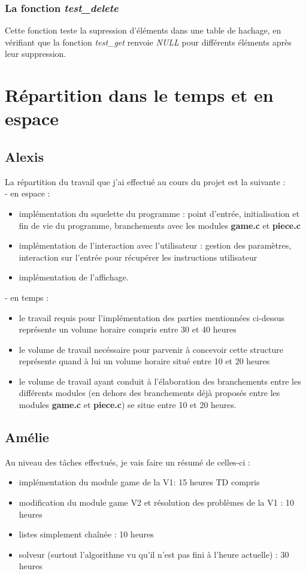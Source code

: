 \documentclass{report}
\begin{document}
\subsubsection*{La fonction \textit{test\_delete}}
Cette fonction teste la supression d'éléments dans une table de hachage, en vérifiant que la fonction \textit{test\_get} renvoie \textit{NULL} pour différents éléments  après leur suppression.

\section{Répartition dans le temps et en espace}
\subsection*{Alexis}
La répartition du travail que j'ai effectué au cours du projet est la suivante :\\
- en espace :
\begin{itemize}
\item implémentation du squelette du programme : point d'entrée, initialisation et fin de vie du programme, branchements avec les modules \textbf{game.c} et \textbf{piece.c}
\item implémentation de l'interaction avec l'utilisateur : gestion des paramètres, interaction sur l'entrée pour récupérer les instructions utilisateur
\item implémentation de l'affichage.
\end{itemize}
- en temps :
\begin{itemize}
\item le travail requis pour l'implémentation des parties mentionnées ci-dessus représente un volume horaire compris entre 30 et 40 heures 
\item le volume de travail necéssaire pour parvenir à concevoir cette structure représente quand à lui un volume horaire situé entre 10 et 20 heures 
\item le volume de travail ayant conduit à l'élaboration des branchements entre les différents modules (en dehors des branchements déjà proposés entre les modules \textbf{game.c} et \textbf{piece.c}) se situe entre 10 et 20 heures.
\end{itemize}
\subsection*{Amélie}
Au niveau des tâches effectués, je vais faire un résumé de celles-ci :
\begin{itemize}
\item implémentation du module game de la V1:  15 heures TD compris
\item modification du module game V2 et résolution des problèmes de la V1 : 10 heures
\item listes simplement chaînée : 10 heures
\item solveur (surtout l'algorithme vu qu'il n'est pas fini à l'heure actuelle) : 30 heures
\end{itemize}
\end{document}
